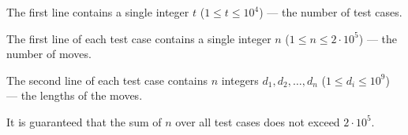 The first line contains a single integer $t$ ($1 \le t \le 10^4$) --- the number of test cases.

The first line of each test case contains a single integer $n$ ($1 \le n \le 2 \cdot 10^5$) --- the number of moves.

The second line of each test case contains $n$ integers $d_1, d_2, \ldots, d_n$ ($1 \le d_i \le 10^9$) --- the lengths of the moves.

It is guaranteed that the sum of $n$ over all test cases does not exceed $2 \cdot 10^5$.
